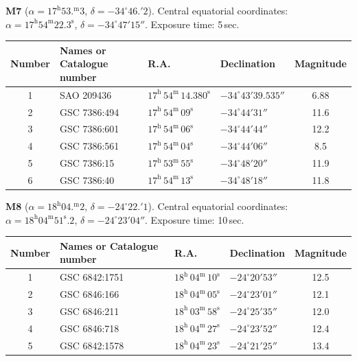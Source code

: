 
\textbf{M7} ($\alpha = 17^{\mathrm{h}}53.^{\mathrm{m}}3$,
$\delta = -34^\circ 46.'2$). Central equatorial coordinates:
$\alpha = 17^{\mathrm{h}}54^{\mathrm{m}}22.3^{\mathrm{s}}$,
$\delta = -34^\circ 47' 15''$. Exposure time: 5\,sec.

\begin{center}
\begin{tabular}{clllc}
Number & Names or Catalogue number & R.A. & Declination & Magnitude \\
\hline
1 & SAO 209436 & $17^{\mathrm{h}}\,54^{\mathrm{m}}\,14.380^{\mathrm{s}}$ & $-34^\circ 43' 39.535''$ & 6.88 \\
2 & GSC 7386:494 & $17^{\mathrm{h}}\,54^{\mathrm{m}}\,09^{\mathrm{s}}$ & $-34^\circ 44' 31''$ & 11.6 \\
3 & GSC 7386:601 & $17^{\mathrm{h}}\,54^{\mathrm{m}}\,06^{\mathrm{s}}$ & $-34^\circ 44' 44''$ & 12.2 \\
4 & GSC 7386:561 & $17^{\mathrm{h}}\,54^{\mathrm{m}}\,04^{\mathrm{s}}$ & $-34^\circ 44' 06''$ & 8.5 \\
5 & GSC 7386:15 & $17^{\mathrm{h}}\,53^{\mathrm{m}}\,55^{\mathrm{s}}$ & $-34^\circ 48' 20''$ & 11.9 \\
6 & GSC 7386:40 & $17^{\mathrm{h}}\,54^{\mathrm{m}}\,13^{\mathrm{s}}$ & $-34^\circ 48' 18''$ & 11.8 \\
\end{tabular}
\end{center}

\textbf{M8} ($\alpha = 18^{\mathrm{h}}04.^{\mathrm{m}}2$,
$\delta = -24^\circ 22.'1$). Central equatorial coordinates:
$\alpha = 18^{\mathrm{h}}04^{\mathrm{m}}51^{\mathrm{s}}.2$,
$\delta = -24^\circ 23' 04''$. Exposure time: 10\,sec.

\begin{center}
\begin{tabular}{clllc}
Number & Names or Catalogue number & R.A. & Declination & Magnitude \\
\hline
1 & GSC 6842:1751 & $18^{\mathrm{h}}\,04^{\mathrm{m}}\,10^{\mathrm{s}}$ & $-24^\circ 20' 53''$ & 12.5 \\
2 & GSC 6846:166 & $18^{\mathrm{h}}\,04^{\mathrm{m}}\,05^{\mathrm{s}}$ & $-24^\circ 23' 01''$ & 12.1 \\
3 & GSC 6846:211 & $18^{\mathrm{h}}\,03^{\mathrm{m}}\,58^{\mathrm{s}}$ & $-24^\circ 25' 35''$ & 12.0 \\
4 & GSC 6846:718 & $18^{\mathrm{h}}\,04^{\mathrm{m}}\,27^{\mathrm{s}}$ & $-24^\circ 23' 52''$ & 12.4 \\
5 & GSC 6842:1578 & $18^{\mathrm{h}}\,04^{\mathrm{m}}\,23^{\mathrm{s}}$ & $-24^\circ 21' 25''$ & 13.4 \\
\end{tabular}
\end{center}

